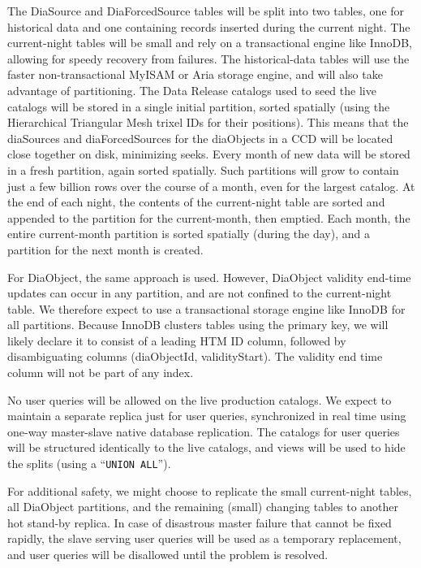 \documentclass[DM,lsstdraft,toc]{lsstdoc}
\begin{document}
The DiaSource and DiaForcedSource tables will be split into two tables,
one for historical data and one containing records inserted during the
current night. The current-night tables will be small and rely on a
transactional engine like InnoDB, allowing for speedy recovery from
failures. The historical-data tables will use the faster
non-transactional MyISAM or Aria storage engine, and will also take
advantage of partitioning. The Data Release catalogs used to seed the
live catalogs will be stored in a single initial partition, sorted
spatially (using the Hierarchical Triangular Mesh trixel IDs for their
positions). This means that the diaSources and diaForcedSources for the
diaObjects in a CCD will be located close together on disk, minimizing
seeks. Every month of new data will be stored in a fresh partition,
again sorted spatially. Such partitions will grow to contain just a few
billion rows over the course of a month, even for the largest catalog.
At the end of each night, the contents of the current-night table are
sorted and appended to the partition for the current-month, then
emptied. Each month, the entire current-month partition is sorted
spatially (during the day), and a partition for the next month is
created.

For DiaObject, the same approach is used. However, DiaObject validity
end-time updates can occur in any partition, and are not confined to the
current-night table. We therefore expect to use a transactional storage
engine like InnoDB for all partitions. Because InnoDB clusters tables
using the primary key, we will likely declare it to consist of a leading
HTM ID column, followed by disambiguating columns (diaObjectId,
validityStart). The validity end time column will not be part of any
index.

No user queries will be allowed on the live production catalogs. We
expect to maintain a separate replica just for user queries,
synchronized in real time using one-way master-slave native database
replication. The catalogs for user queries will be structured
identically to the live catalogs, and views will be used to hide the
splits (using a ``\texttt{UNION\ ALL}'').

For additional safety, we might choose to replicate the small
current-night tables, all DiaObject partitions, and the remaining
(small) changing tables to another hot stand-by replica. In case of
disastrous master failure that cannot be fixed rapidly, the slave
serving user queries will be used as a temporary replacement, and user
queries will be disallowed until the problem is resolved.
\end{document}
